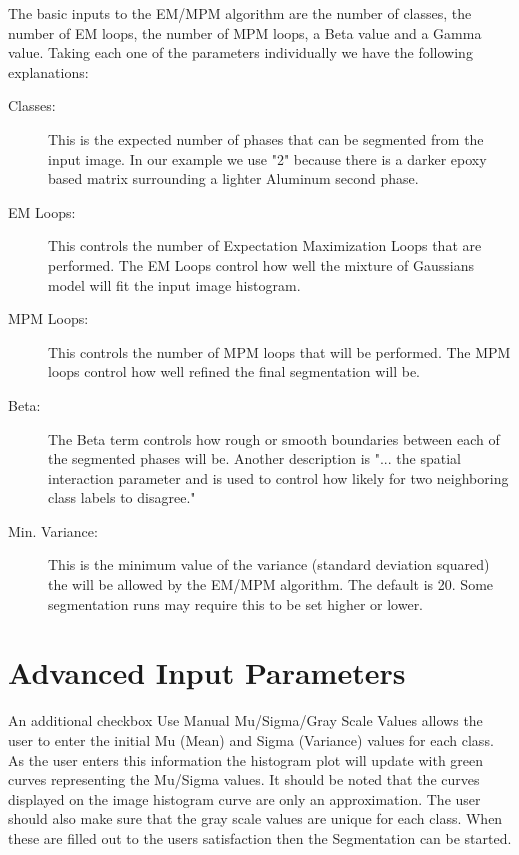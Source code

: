 \documentclass[12pt,oneside]{book}
\begin{document}
The basic inputs to the EM/MPM algorithm are the number of classes, the number of EM loops, the number of MPM loops, a Beta value and a Gamma value. Taking each one of the parameters individually we have the following explanations: 
\begin{description}
\item[Classes:]This is the expected number of phases that can be segmented from the input image. In our example we use "2" because there is a darker epoxy based matrix surrounding a lighter Aluminum second phase. 
\item[EM Loops:]  This controls the number of Expectation Maximization Loops that are performed. The EM Loops control how well the mixture of Gaussians model will fit the input image histogram. 
\item[MPM Loops:]  This controls the number of MPM loops that will be performed. The MPM loops control how well refined the final segmentation will be. 
\item[Beta:]  The Beta term controls how rough or smooth boundaries between each of the segmented phases will be. Another description is "... the spatial interaction parameter and is used to control how likely for two neighboring class labels to disagree."
\item[Min. Variance:]  This is the minimum value of the variance (standard deviation squared) the will be allowed by the EM/MPM algorithm. The default is 20. Some segmentation runs may require this to be set higher or lower.
\end{description}

\section{Advanced Input Parameters}
An additional checkbox Use Manual Mu/Sigma/Gray Scale Values allows the user to enter the initial Mu (Mean) and Sigma (Variance) values for each class. As the user enters this information the histogram plot will update with green curves representing the Mu/Sigma values. It should be noted that the curves displayed on the image histogram curve are only an approximation. The user should also make sure that the gray scale values are unique for each class. When these are filled out to the users satisfaction then the Segmentation can be started.

  
\end{document}
